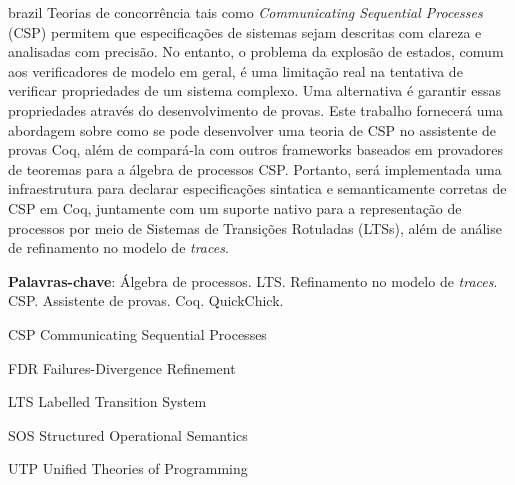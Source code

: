 \documentclass[
	12pt,				%
	a4paper,			%
	oneside,
	english			%
	]{abntex2}
\theoremstyle{definition}
\begin{document}
\begin{resumo}[Resumo]
 \begin{otherlanguage*}{brazil}
   Teorias de concorrência tais como \emph{Communicating Sequential Processes} (CSP) permitem que especificações de sistemas sejam descritas com clareza e analisadas com precisão. No entanto, o problema da explosão de estados, comum aos verificadores de modelo em geral, é uma limitação real na tentativa de verificar propriedades de um sistema complexo. Uma alternativa é garantir essas propriedades através do desenvolvimento de provas. Este trabalho fornecerá uma abordagem sobre como se pode desenvolver uma teoria de CSP no assistente de provas Coq, além de compará-la com outros frameworks baseados em provadores de teoremas para  a álgebra de processos CSP. Portanto, será implementada uma infraestrutura para declarar especificações sintatica e semanticamente corretas de CSP em Coq, juntamente com um suporte nativo para a representação de processos por meio de Sistemas de Transições Rotuladas (LTSs), além de análise de refinamento no modelo de \emph{traces}.

   \textbf{Palavras-chave}: Álgebra de processos. LTS. Refinamento no modelo de \emph{traces}. CSP. Assistente de provas. Coq. QuickChick.
 \end{otherlanguage*}
\end{resumo}

\listoffigures*
\cleardoublepage

\listoftables*
\cleardoublepage

\begin{siglas}
	\item[CSP] Communicating Sequential Processes
	\item[FDR] Failures-Divergence Refinement
	\item[LTS] Labelled Transition System
	\item[SOS] Structured Operational Semantics
	\item[UTP] Unified Theories of Programming
\end{siglas}

\tableofcontents*
\cleardoublepage


\textual
\end{document}
